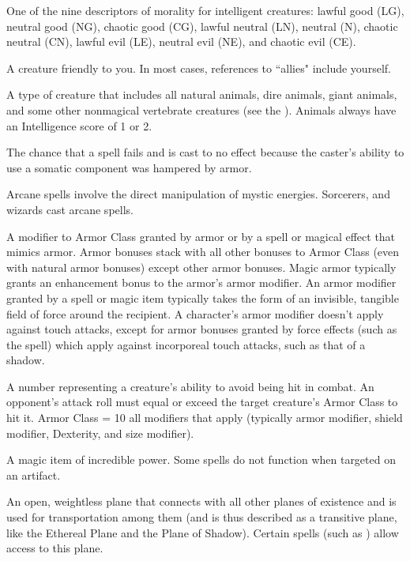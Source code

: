  One of the nine descriptors of morality for intelligent 
creatures: lawful good (LG), neutral good (NG), chaotic good (CG), lawful neutral 
(LN), neutral (N), chaotic neutral (CN), lawful 
evil (LE), neutral evil (NE), and chaotic evil (CE). 

 A creature friendly to you. In most cases, 
references to ``allies" include yourself. 

 A type of creature that includes 
all natural animals, dire animals, giant 
animals, and some other nonmagical 
vertebrate creatures (see the ). 
Animals always have an Intelligence score of 1 
or 2. 

 The chance that a spell 
fails and is cast to no effect because the 
caster's ability to use a somatic 
component was hampered by armor. 

 Arcane spells involve the direct manipulation of 
mystic energies. Sorcerers, and wizards cast arcane spells. 

 A modifier to Armor Class granted by armor or by a spell or magical effect that mimics armor. Armor bonuses stack with 
all other bonuses to Armor Class (even with natural armor bonuses) 
except other armor bonuses. Magic armor typically grants an 
enhancement bonus to the armor's armor modifier. An armor modifier
granted by a spell or magic item typically takes the form of an 
invisible, tangible field of force around the recipient. A character's armor modifier doesn't apply against touch attacks, except for armor bonuses 
granted by force effects (such as the  spell) which apply 
against incorporeal touch attacks, such as that of a shadow. 

 A number representing a creature's 
ability to avoid being hit in combat. An opponent's attack 
roll must equal or exceed the target creature's Armor Class 
to hit it. Armor Class = 10 \add all modifiers that apply 
(typically armor modifier, shield modifier, Dexterity, and size modifier). 

 A magic item of incredible power. 
Some spells do not function when targeted on an artifact. 

 An open, weightless plane 
that connects with all other planes of 
existence and is used for transportation 
among them (and is thus described as a 
transitive plane, like the Ethereal Plane 
and the Plane of Shadow). Certain 
spells (such as  ) allow 
access to this plane. 

